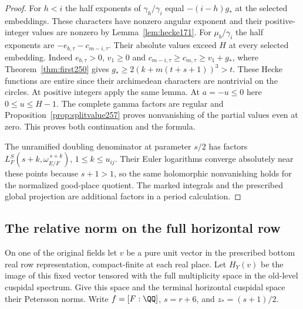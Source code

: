 \documentclass[a4paper,11pt]{article}
\theoremstyle{definition}
\theoremstyle{remark}
\numberwithin{equation}{section}
\begin{document}
\begin{proof}
For \(h<i\) the half exponents of \(\gamma_h/\gamma_i\) equal
\(-(i-h)g_*\) at the selected embeddings. These characters
have nonzero angular exponent and their positive-integer
values are nonzero by Lemma~\ref{lem:hecke171}. For
\(\mu_b/\gamma_i\) the half exponents are
\(-e_{b,\tau}-c_{m-i,\tau}\). Their absolute values exceed
\(H\) at every selected embedding. Indeed \(e_{b,\tau}>0\),
\(v_1\ge0\) and \(c_{m-i,\tau}\ge c_{m,\tau}\ge v_1+g_*\),
where Theorem~\ref{thm:first250} gives
\(g_*\ge2(k+m(t+s+1))^3>t\). These Hecke functions are entire
since their archimedean characters are nontrivial on the
circles. At positive integers apply the same lemma. At
\(a=-u\le0\) here \(0\le u\le H-1\). The complete gamma factors
are regular and Proposition~\ref{prop:splitvalue257} proves
nonvanishing of the partial values even at zero. This proves
both continuation and the formula.

The unramified doubling denominator at parameter \(s/2\) has
factors \(L_F^S(s+k,\omega_{E/F}^{\,s+k})\), \(1\le k\le
u_{ij}\). Their Euler logarithms converge absolutely near these
points because \(s+1>1\), so the same holomorphic nonvanishing
holds for the normalized good-place quotient. The marked
integrals and the prescribed global projection are additional
factors in a period calculation.
\end{proof}

\subsection{The relative norm on the full horizontal row}\label{nav:VI-40}
On one of the original fields let \(v\) be a pure unit vector in
the prescribed bottom real row representation, compact-finite at
each real place. Let \(H_Y(v)\) be the image of this fixed vector
tensored with the full multiplicity space in the old-level
cuspidal spectrum. Give this space and the terminal horizontal
cuspidal space their Petersson norms. Write \(f=[F:\QQ]\),
\(s=r+6\), and \(z_*=(s+1)/2\).
\end{document}
